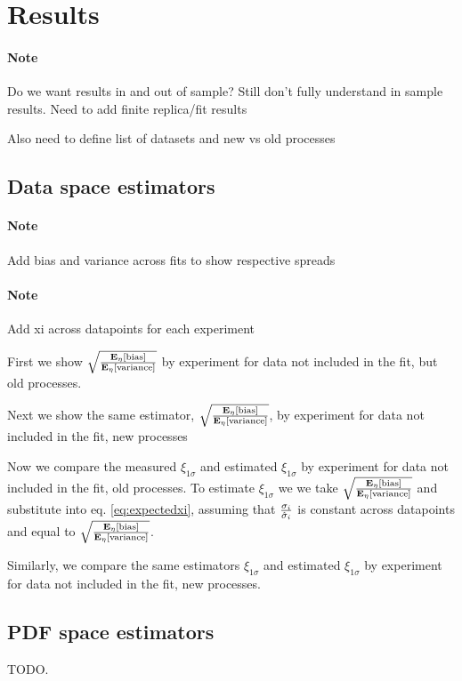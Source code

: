 \section{Results}
\paragraph{Note}{Do we want results in and out of sample? Still don't
fully understand in sample results. Need to add finite replica/fit results}

Also need to define list of datasets and new vs old processes

\subsection{Data space estimators}

\paragraph{Note}{Add bias and variance across fits to show respective spreads}

\paragraph{Note}{Add xi across datapoints for each experiment}

First we show $\sqrt{\frac{\mathbf{E}_{\eta}\left[ {\rm bias} \right]}{\mathbf{E}_{\eta}\left[ {\rm variance} \right]}}$ by experiment for data
not included in the fit, but old processes.



Next we show the same estimator, $\sqrt{\frac{\mathbf{E}_{\eta}\left[ {\rm bias} \right]}{\mathbf{E}_{\eta}\left[ {\rm variance} \right]}}$, by
experiment for data not included in the fit, new processes



Now we compare the measured $\xi_{1\sigma}$ and estimated $\xi_{1\sigma}$ by experiment
for data not included in the fit, old processes. To estimate $\xi_{1\sigma}$
we we take $\sqrt{\frac{\mathbf{E}_{\eta}\left[ {\rm bias} \right]}{\mathbf{E}_{\eta}\left[ {\rm variance} \right]}}$ and substitute into
eq. \eqref{eq:expectedxi}, assuming that $\frac{\sigma_i}{\hat{\sigma}_i}$ is
constant across datapoints and equal to $\sqrt{\frac{\mathbf{E}_{\eta}\left[ {\rm bias} \right]}{\mathbf{E}_{\eta}\left[ {\rm variance} \right]}}$.



Similarly, we compare the same estimators $\xi_{1\sigma}$ and estimated
$\xi_{1\sigma}$ by experiment for data not included in the fit, new processes.



\subsection{PDF space estimators}

TODO.

